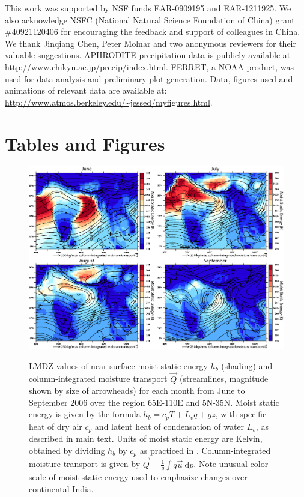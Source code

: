 	This work was supported by NSF funds EAR-0909195 and EAR-1211925. We also acknowledge NSFC (National Natural Science Foundation of China) grant \#40921120406 for encouraging the feedback and support of colleagues in China. We thank Jinqiang Chen, Peter Molnar and two anonymous reviewers for their valuable suggestions. APHRODITE precipitation data is publicly available at \url{http://www.chikyu.ac.jp/precip/index.html}. FERRET, a NOAA product, was used for data analysis and preliminary plot generation. Data, figures used and animations of relevant data are available at: \url{http://www.atmos.berkeley.edu/~jessed/myfigures.html}.

\newpage	
\section{Tables and Figures}
\clearpage	

\begin{figure}[t]
  \noindent\includegraphics[width=36pc,angle=0]{Figures/ch3/fig11lmdz}\\
  \caption{LMDZ values of near-surface moist static energy $h_b$ (shading) and column-integrated moisture transport $\vec{Q}$ (streamlines, magnitude shown by size of arrowheads) for each month from June to September 2006 over the region 65\textdegree E-110\textdegree E and 5\textdegree N-35\textdegree N. Moist static energy is given by the formula $h_b=c_pT+L_vq+gz$, with specific heat of dry air $c_p$ and latent heat of condensation of water $L_v$, as described in main text. Units of moist static energy are Kelvin, obtained by dividing $h_b$ by $c_p$ as practiced in \cite{Boos2013a}. Column-integrated moisture transport is given by $\vec{Q}=\frac{1}{g}\int q\vec{u}\ \mathrm{d}p $. Note unusual color scale of moist static energy used to emphasize changes over continental India.}
\label{fig:f31}
\end{figure}

